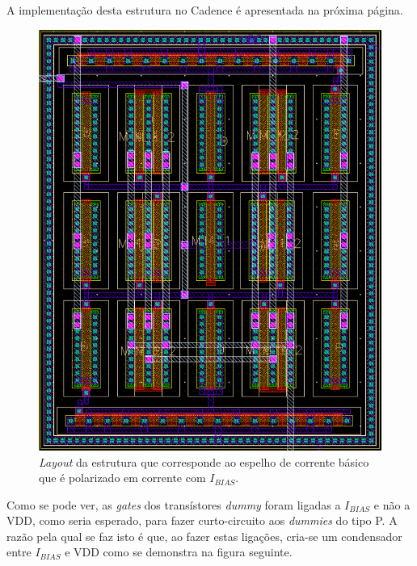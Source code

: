 \documentclass[11pt]{article}
\numberwithin{equation}{section}
\begin{document}
A implementação desta estrutura no Cadence é apresentada na próxima página.

\pagebreak

\begin{figure}[H]
	\centering
	\includegraphics[keepaspectratio=true, scale=0.65]{exps/layout/espelhodecorrente}
	\vspace{-0.5em}
	\caption{\textit{Layout} da estrutura que corresponde ao espelho de corrente básico que é polarizado em corrente com $I_{BIAS}$.}
	\vspace{-0.8em}
\end{figure}

\pagebreak

Como se pode ver, as \textit{gates} dos transístores \textit{dummy} foram ligadas a $I_{BIAS}$ e não a VDD, como seria esperado, para fazer curto-circuito aos \textit{dummies} do tipo P. A razão pela qual se faz isto é que, ao fazer estas ligações, cria-se um condensador entre $I_{BIAS}$ e VDD como se demonstra na figura seguinte.
\end{document}
